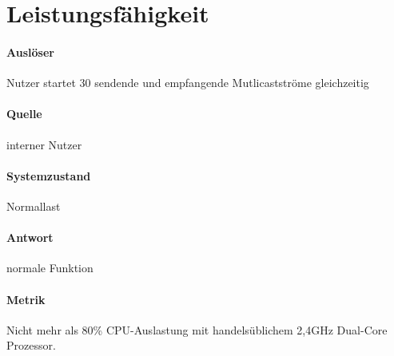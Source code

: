 \section{Leistungsfähigkeit}
\label{sec:8:leistung}
\paragraph{Auslöser} Nutzer startet 30 sendende und empfangende Mutlicastströme
gleichzeitig
\paragraph{Quelle} interner Nutzer
\paragraph{Systemzustand} Normallast
\paragraph{Antwort} normale Funktion
\paragraph{Metrik} Nicht mehr als 80\% CPU-Auslastung mit handelsüblichem 2,4GHz
Dual-Core Prozessor.
